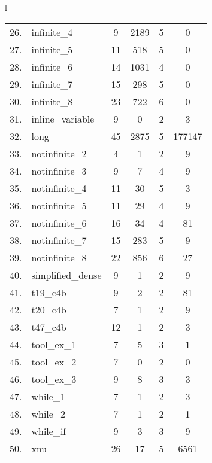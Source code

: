 \begin{table}[p]
{\begin{tabular}{l}
\begin{tabular}{p{.6cm}lcccc}
\midrule
26. & infinite\_4& 9 & 2189 &5 &0 \\
27. & infinite\_5&11 &518 &5 &0 \\
28. & infinite\_6&14 & 1031 &4 &0 \\
29. & infinite\_7&15 &298 &5 &0 \\
30. & infinite\_8&23 &722 &6 &0 \\
31. & inline\_variable & 9 &0 &2 &3 \\
32. & long&45 & 2875 &5 & 177147 \\
33. & notinfinite\_2 & 4 &1 &2 &9 \\
34. & notinfinite\_3 & 9 &7 &4 &9 \\
35. & notinfinite\_4 &11 & 30 &5 &3 \\
36. & notinfinite\_5 &11 & 29 &4 &9 \\
37. & notinfinite\_6 &16 & 34 &4 & 81 \\
38. & notinfinite\_7 &15 &283 &5 &9 \\
39. & notinfinite\_8 &22 &856 &6 & 27 \\
40. & simplified\_dense& 9 &1 &2 &9 \\
41. & t19\_c4b & 9 &2 &2 & 81 \\
42. & t20\_c4b & 7 &1 &2 &9 \\
43. & t47\_c4b &12 &1 &2 &3 \\
44. & tool\_ex\_1 & 7 &5 &3 &1 \\
45. & tool\_ex\_2 & 7 &0 &2 &0 \\
46. & tool\_ex\_3 & 9 &8 &3 &3 \\
47. & while\_1 & 7 &1 &2 &3 \\
48. & while\_2 & 7 &1 &2 &1 \\
49. & while\_if& 9 &3 &3 &9 \\
50. & xnu &26 & 17 &5 & 6561 \\
\end{tabular} \\ 
\bottomrule
\end{tabular}
}
\label{tab:eval}
\end{table}

